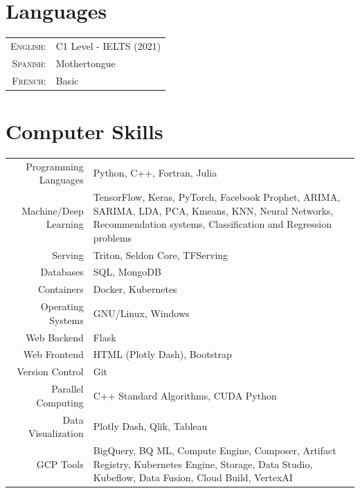 \documentclass[a4paper,10pt]{article} %
\begin{document}
\section{Languages}
\bigskip
\begin{tabular}{rl}
	\textsc{English:} & C1 Level - IELTS (2021)\\
	\textsc{Spanish:} & Mothertongue \\
	\textsc{French:} & Basic
\end{tabular}



\section{Computer Skills}
\bigskip
\begin{tabular}{r|p{10.5cm}}
	Programming Languages & Python, C++, Fortran, Julia \\
	Machine/Deep Learning & TensorFlow, Keras, PyTorch, Facebook Prophet, ARIMA, SARIMA, LDA, PCA, Kmeans, KNN, Neural Networks, Recommendation systems, Classification and Regression problems\\
	Serving & Triton, Seldon Core, TFServing \\
	Databases & SQL, MongoDB \\
	Containers & Docker, Kubernetes \\
	Operating Systems & GNU/Linux, Windows \\
	Web Backend & Flask \\
	Web Frontend & HTML (Plotly Dash), Bootstrap \\
	Version Control & Git \\
	Parallel Computing & C++ Standard Algorithms, CUDA Python\\
	Data Visualization & Plotly Dash, Qlik, Tableau \\
	GCP Tools & BigQuery, BQ ML, Compute Engine, Composer, Artifact Registry, Kubernetes Engine, Storage, Data Studio, Kubeflow, Data Fusion, Cloud Build, VertexAI
\end{tabular}
\bigskip
\end{document}
